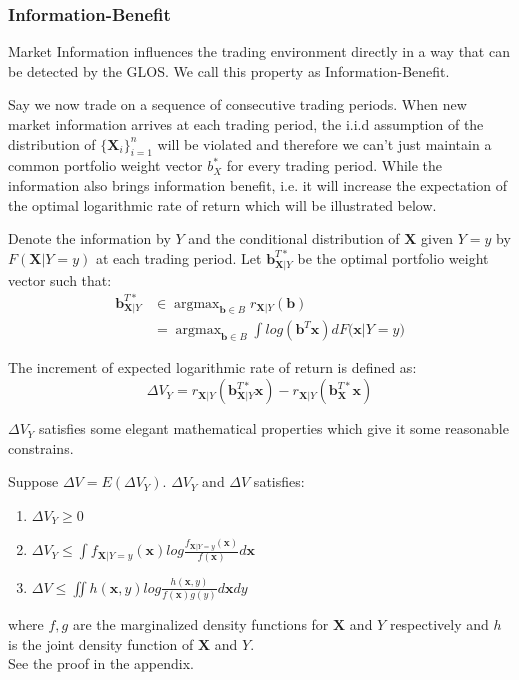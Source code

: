 \documentclass{gapd}
\begin{document}
\subsubsection{Information-Benefit}

Market Information influences the trading environment directly in a way that can be detected by the GLOS. We call this property as Information-Benefit. 

Say we now trade on a sequence of consecutive trading periods. When new market information arrives at each trading period, the i.i.d assumption of the distribution of  $\{\textbf{X}_i\}_{i=1}^n$ will be violated and therefore we can't just maintain a common portfolio weight vector $b_X^*$ for every trading period. While the information also brings information benefit, i.e. it will increase the expectation of the optimal logarithmic rate of return which will be illustrated below. 

Denote the information by $Y$ and the conditional distribution of $\textbf{X}$ given $Y=y$ by $F(\textbf{X}|Y=y)$ at each trading period. Let $\textbf{b}_{\textbf{X}|Y}^{T*}$ be the optimal portfolio weight vector such that: 
\begin{equation}
\begin{aligned}
\textbf{b}_{\textbf{X}|Y}^{T*}
&\in \mathop{\arg\max}_{\textbf{b}\in B}r_{\textbf{X}|Y}(\textbf{b})\\
&=\mathop{\arg\max}_{\textbf{b}\in B}\int{log(\textbf{b}^T\textbf{x})dF(\textbf{x}|Y=y})
\end{aligned}
\end{equation}

The increment of expected logarithmic rate of return is defined as: 
\begin{equation}
\Delta V_Y=r_{\textbf{X}|Y}(\textbf{b}_{\textbf{X}|Y}^{T*}\textbf{x})-r_{\textbf{X}|Y}(\textbf{b}_{\textbf{X}}^{T*}\textbf{x})
\end{equation}

$\Delta V_Y$ satisfies some elegant mathematical properties which give it some reasonable constrains.
\begin{theorem}
Suppose $\Delta V=E(\Delta V_Y)$. $\Delta V_Y$ and $\Delta V$ satisfies:\\
\begin{enumerate}[1)]
\item $\Delta V_Y \ge 0$
\item $\Delta V_Y \le \int{f_{\textbf{X}|Y=y}(\textbf{x})log\frac{f_{\textbf{X}|Y=y}(\textbf{x})}{f(\textbf{x})}d\textbf{x}}$
\item $\Delta V \le \iint{h(\textbf{x},y)log\frac{h(\textbf{x},y)}{f(\textbf{x})g(y)}d\textbf{x}dy}$ 
\end{enumerate}
where $f,g$ are the marginalized density functions for $\textbf{X}$ and $Y$ respectively and $h$ is the joint density function of  $\textbf{X}$ and $Y$. \\
See the proof in the appendix.
\end{theorem}
\end{document}
